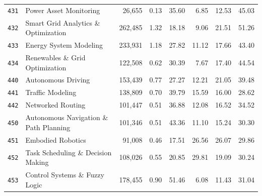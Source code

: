 \begin{longtable}{@{}l l r r r r r r@{}}
\texttt{431} & Power Asset Monitoring & 26,655 & 0.13 & 35.60 & 6.85 & 12.53 & 45.03 \\
\texttt{432} & Smart Grid Analytics \& Optimization & 262,485 & 1.32 & 18.18 & 9.06 & 21.51 & 51.26 \\
\texttt{433} & Energy System Modeling & 233,931 & 1.18 & 27.82 & 11.12 & 17.66 & 43.40 \\
\texttt{434} & Renewables \& Grid Optimization & 122,508 & 0.62 & 30.39 & 7.67 & 17.40 & 44.54 \\
\texttt{440} & Autonomous Driving & 153,439 & 0.77 & 27.27 & 12.21 & 21.05 & 39.48 \\
\texttt{441} & Traffic Modeling & 138,809 & 0.70 & 39.79 & 15.59 & 16.00 & 28.62 \\
\texttt{442} & Networked Routing & 101,447 & 0.51 & 36.88 & 12.08 & 16.52 & 34.52 \\
\texttt{450} & Autonomous Navigation \& Path Planning & 101,346 & 0.51 & 43.36 & 11.10 & 15.24 & 30.30 \\
\texttt{451} & Embodied Robotics & 91,008 & 0.46 & 17.51 & 26.56 & 26.07 & 29.86 \\
\texttt{452} & Task Scheduling \& Decision Making & 108,026 & 0.55 & 20.85 & 29.81 & 19.09 & 30.24 \\
\texttt{453} & Control Systems \& Fuzzy Logic & 178,455 & 0.90 & 51.46 & 6.08 & 11.43 & 31.04 \\
\end{longtable}
